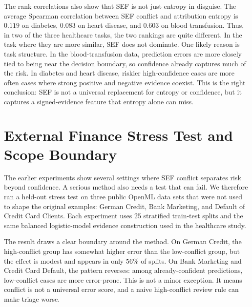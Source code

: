 \documentclass[11pt]{article}
\begin{document}
The rank correlations also show that SEF is not just entropy in disguise. The average Spearman correlation between SEF conflict and attribution entropy is $0.119$ on diabetes, $0.083$ on heart disease, and $0.603$ on blood transfusion. Thus, in two of the three healthcare tasks, the two rankings are quite different. In the task where they are more similar, SEF does not dominate. One likely reason is task structure. In the blood-transfusion data, prediction errors are more closely tied to being near the decision boundary, so confidence already captures much of the risk. In diabetes and heart disease, riskier high-confidence cases are more often cases where strong positive and negative evidence coexist. This is the right conclusion: SEF is not a universal replacement for entropy or confidence, but it captures a signed-evidence feature that entropy alone can miss.

\FloatBarrier

\section{External Finance Stress Test and Scope Boundary}

The earlier experiments show several settings where SEF conflict separates risk beyond confidence. A serious method also needs a test that can fail. We therefore ran a held-out stress test on three public OpenML data sets that were not used to shape the original examples: German Credit, Bank Marketing, and Default of Credit Card Clients. Each experiment uses 25 stratified train-test splits and the same balanced logistic-model evidence construction used in the healthcare study.

\begin{table}[!htbp]
\centering
\caption{External finance and credit-risk stress test over 25 splits. The comparison is restricted to the most confident half of predictions. Success is the fraction of splits where the high-conflict quartile has higher error than the low-conflict quartile.}
\label{tab:finance-scope}
\resizebox{\textwidth}{!}{}
\end{table}

The result draws a clear boundary around the method. On German Credit, the high-conflict group has somewhat higher error than the low-conflict group, but the effect is modest and appears in only $56\%$ of splits. On Bank Marketing and Credit Card Default, the pattern reverses: among already-confident predictions, low-conflict cases are more error-prone. This is not a minor exception. It means conflict is not a universal error score, and a naive high-conflict review rule can make triage worse.
\end{document}
